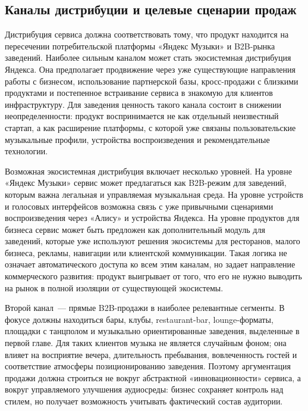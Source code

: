 \subsection{Каналы дистрибуции и целевые сценарии продаж}
\label{subsec:service:monetization:distribution}

Дистрибуция сервиса должна соответствовать тому, что продукт находится на пересечении потребительской платформы «Яндекс Музыки» и B2B-рынка заведений. Наиболее сильным каналом может стать экосистемная дистрибуция Яндекса. Она предполагает продвижение через уже существующие направления работы с бизнесом, использование партнерской базы, кросс-продажи с близкими продуктами и постепенное встраивание сервиса в знакомую для клиентов инфраструктуру. Для заведения ценность такого канала состоит в снижении неопределенности: продукт воспринимается не как отдельный неизвестный стартап, а как расширение платформы, с которой уже связаны пользовательские музыкальные профили, устройства воспроизведения и рекомендательные технологии.

Возможная экосистемная дистрибуция включает несколько уровней. На уровне «Яндекс Музыки» сервис может предлагаться как B2B-режим для заведений, которым важна легальная и управляемая музыкальная среда. На уровне устройств и голосовых интерфейсов возможна связь с уже привычными сценариями воспроизведения через «Алису» и устройства Яндекса. На уровне продуктов для бизнеса сервис может быть предложен как дополнительный модуль для заведений, которые уже используют решения экосистемы для ресторанов, малого бизнеса, рекламы, навигации или клиентской коммуникации. Такая логика не означает автоматического доступа ко всем этим каналам, но задает направление коммерческого развития: продукт выигрывает от того, что его не нужно выводить на рынок в полной изоляции от существующей экосистемы.

Второй канал~--- прямые B2B-продажи в наиболее релевантные сегменты. В фокусе должны находиться бары, клубы, restaurant-bar, lounge-форматы, площадки с танцполом и музыкально ориентированные заведения, выделенные в первой главе. Для таких клиентов музыка не является случайным фоном; она влияет на восприятие вечера, длительность пребывания, вовлеченность гостей и соответствие атмосферы позиционированию заведения. Поэтому аргументация продажи должна строиться не вокруг абстрактной «инновационности» сервиса, а вокруг управляемого улучшения аудиосреды: бизнес сохраняет контроль над стилем, но получает возможность учитывать фактический состав аудитории.

